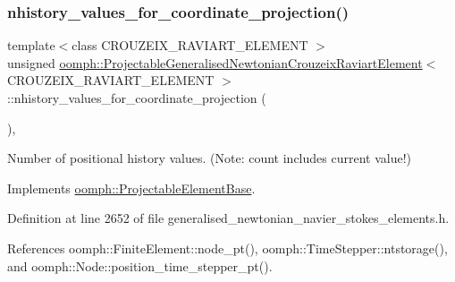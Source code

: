 \subsubsection{\texorpdfstring{nhistory\+\_\+values\+\_\+for\+\_\+coordinate\+\_\+projection()}{nhistory\_values\_for\_coordinate\_projection()}}
{\footnotesize\ttfamily template$<$class C\+R\+O\+U\+Z\+E\+I\+X\+\_\+\+R\+A\+V\+I\+A\+R\+T\+\_\+\+E\+L\+E\+M\+E\+NT $>$ \\
unsigned \hyperlink{classoomph_1_1ProjectableGeneralisedNewtonianCrouzeixRaviartElement}{oomph\+::\+Projectable\+Generalised\+Newtonian\+Crouzeix\+Raviart\+Element}$<$ C\+R\+O\+U\+Z\+E\+I\+X\+\_\+\+R\+A\+V\+I\+A\+R\+T\+\_\+\+E\+L\+E\+M\+E\+NT $>$\+::nhistory\+\_\+values\+\_\+for\+\_\+coordinate\+\_\+projection (\begin{DoxyParamCaption}{ }\end{DoxyParamCaption})\hspace{0.3cm}{\ttfamily [inline]}, {\ttfamily [virtual]}}



Number of positional history values. (Note\+: count includes current value!) 



Implements \hyperlink{classoomph_1_1ProjectableElementBase_ab4ecd0cd24000a3ed675dc7198203c1f}{oomph\+::\+Projectable\+Element\+Base}.



Definition at line 2652 of file generalised\+\_\+newtonian\+\_\+navier\+\_\+stokes\+\_\+elements.\+h.



References oomph\+::\+Finite\+Element\+::node\+\_\+pt(), oomph\+::\+Time\+Stepper\+::ntstorage(), and oomph\+::\+Node\+::position\+\_\+time\+\_\+stepper\+\_\+pt().

\mbox{\label{classoomph_1_1ProjectableGeneralisedNewtonianCrouzeixRaviartElement_aa1351493ce07955f66bcc56b4a2beabf}} 
